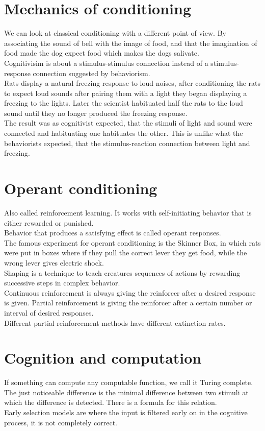 \documentclass[11pt]{article}
\begin{document}
	\newpage
	\section{Mechanics of conditioning}
	We can look at classical conditioning with a different point of view. By associating the sound of bell with the image of food, and that the imagination of food made the dog expect food which makes the dogs salivate.\\
	Cognitivisim is about a stimulus-stimulus connection instead of a stimulus-response connection suggested by behaviorism.\\
	Rats display a natural freezing response to loud noises, after conditioning the rats to expect loud sounds after pairing them with a light they began displaying a freezing to the lights. Later the scientist habituated half the rats to the loud sound until they no longer produced the freezing response.\\
	The result was as cognitivist expected, that the stimuli of light and sound were connected and habituating one habituates the other. This is unlike what the behaviorists expected, that the stimulus-reaction connection between light and freezing.
	
	\section{Operant conditioning}
	Also called reinforcement learning. It works with self-initiating behavior that is either rewarded or punished.\\
	Behavior that produces a satisfying effect is called operant responses.\\
	The famous experiment for operant conditioning is the Skinner Box, in which rats were put in boxes where if they pull the correct lever they get food, while the wrong lever gives electric shock.\\
	Shaping is a technique to teach creatures sequences of actions by rewarding successive steps in complex behavior.\\
	Continuous reinforcement is always giving the reinforcer after a desired response is given. Partial reinforcement is giving the reinforcer after a certain number or interval of desired responses.\\
	Different partial reinforcement methods have different extinction rates.
	
	\section{Cognition and computation}
	If something can compute any computable function, we call it Turing complete.\\
	The just noticeable difference is the minimal difference between two stimuli at which the difference is detected. There is a formula for this relation.\\
	Early selection models are where the input is filtered early on in the cognitive process, it is not completely correct.
\end{document}
